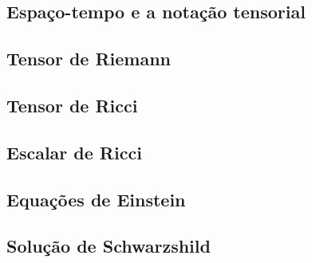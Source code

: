 \documentclass[12pt,a4paper,titlepage,brazil]{article}
\begin{document}

\subsection{Espaço-tempo e a notação tensorial}


\subsection{Tensor de Riemann}


\subsection{Tensor de Ricci}


\subsection{Escalar de Ricci}


\subsection{Equações de Einstein}


\subsection{Solução de Schwarzshild}


\end{document}
